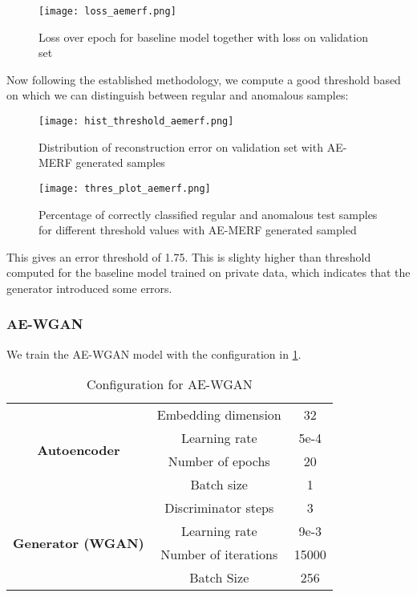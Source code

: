 \begin{figure}[h]
    \centering
    \texttt{[image: loss\_aemerf.png]}
    \caption{Loss over epoch for baseline model together with loss on validation set}
    \label{fig:loss_aemerf}
\end{figure}

Now following the established methodology, we compute a good threshold based on which we can distinguish between regular and anomalous samples:

\begin{figure}[h]
    \begin{minipage}[b]{0.45\textwidth}
        \centering
        \texttt{[image: hist\_threshold\_aemerf.png]}
        \caption{Distribution of reconstruction error on validation set with AE-MERF generated samples}
        \label{fig:enter-label}
    \end{minipage}
    \begin{minipage}[b]{0.45\textwidth}
        \centering
        \texttt{[image: thres\_plot\_aemerf.png]}
        \caption{Percentage of correctly classified regular and anomalous test samples for different threshold values with AE-MERF generated sampled}
        \label{fig:enter-label}
    \end{minipage}
\end{figure}

This gives an error threshold of 1.75. This is slighty higher than threshold computed for the baseline model trained on private data, which indicates that the generator introduced some errors.

\subsubsection*{AE-WGAN}
We train the AE-WGAN model with the configuration in \cref{tab:aewgan_config}.

\begin{table}[h] 
    \centering
    \begin{tabular}{|c|c|c|}
        \hline
        \multirow{4}{*}{\textbf{Autoencoder}}& Embedding dimension & 32 \\ 
                                    & Learning rate & 5e-4 \\
                                    & Number of epochs& 20\\
                                    & Batch size & 1\\
        \hline
        \multirow{4}{*}{\textbf{Generator (WGAN)}} & Discriminator steps & 3 \\
                                        & Learning rate & 9e-3\\
                                        & Number of iterations & 15000\\
                                        & Batch Size & 256 \\
        \hline
    \end{tabular}
    \caption{Configuration for AE-WGAN}
    \label{tab:aewgan_config}
\end{table}

